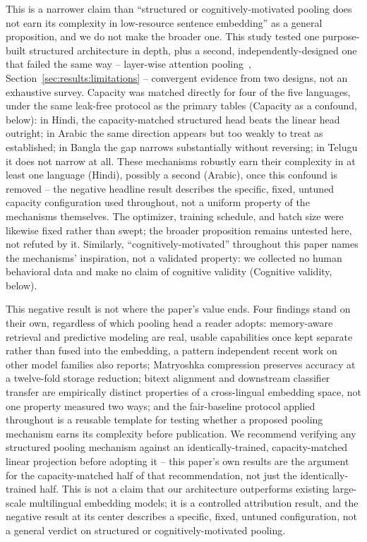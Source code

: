\documentclass[manuscript]{acmart}
\begin{document}
This is a narrower claim than ``structured or cognitively-motivated pooling does not earn its complexity in low-resource sentence embedding'' as a general proposition, and we do not make the broader one. This study tested one purpose-built structured architecture in depth, plus a second, independently-designed one that failed the same way -- layer-wise attention pooling~\citep{oh2022dontjudge}, Section~\ref{sec:results:limitations} -- convergent evidence from two designs, not an exhaustive survey. Capacity was matched directly for four of the five languages, under the same leak-free protocol as the primary tables (Capacity as a confound, below): in Hindi, the capacity-matched structured head beats the linear head outright; in Arabic the same direction appears but too weakly to treat as established; in Bangla the gap narrows substantially without reversing; in Telugu it does not narrow at all. These mechanisms robustly earn their complexity in at least one language (Hindi), possibly a second (Arabic), once this confound is removed -- the negative headline result describes the specific, fixed, untuned capacity configuration used throughout, not a uniform property of the mechanisms themselves. The optimizer, training schedule, and batch size were likewise fixed rather than swept; the broader proposition remains untested here, not refuted by it. Similarly, ``cognitively-motivated'' throughout this paper names the mechanisms' inspiration, not a validated property: we collected no human behavioral data and make no claim of cognitive validity (Cognitive validity, below).

This negative result is not where the paper's value ends. Four findings stand on their own, regardless of which pooling head a reader adopts: memory-aware retrieval and predictive modeling are real, usable capabilities once kept separate rather than fused into the embedding, a pattern independent recent work on other model families also reports; Matryoshka compression preserves accuracy at a twelve-fold storage reduction; bitext alignment and downstream classifier transfer are empirically distinct properties of a cross-lingual embedding space, not one property measured two ways; and the fair-baseline protocol applied throughout is a reusable template for testing whether a proposed pooling mechanism earns its complexity before publication. We recommend verifying any structured pooling mechanism against an identically-trained, capacity-matched linear projection before adopting it -- this paper's own results are the argument for the capacity-matched half of that recommendation, not just the identically-trained half. This is not a claim that our architecture outperforms existing large-scale multilingual embedding models; it is a controlled attribution result, and the negative result at its center describes a specific, fixed, untuned configuration, not a general verdict on structured or cognitively-motivated pooling.
\end{document}

